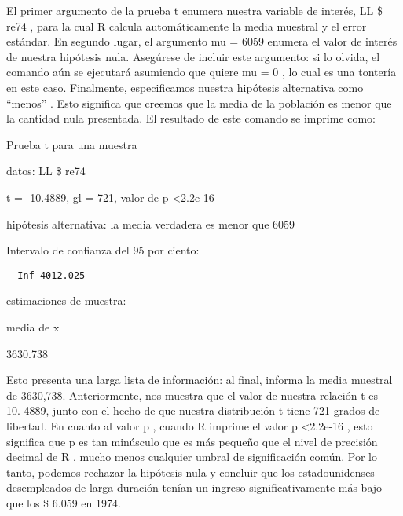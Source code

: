 \documentclass[
]{book}
\begin{document}
El primer argumento de la prueba t enumera nuestra variable de interés, LL \$ re74 , para la cual R calcula automáticamente la media muestral y el error estándar. En segundo lugar, el argumento mu = 6059 enumera el valor de interés de nuestra hipótesis nula. Asegúrese de incluir este argumento: si lo olvida, el comando aún se ejecutará asumiendo que quiere mu = 0 , lo cual es una tontería en este caso. Finalmente, especificamos nuestra hipótesis alternativa como ``menos'' . Esto significa que creemos que la media de la población es menor que la cantidad nula presentada. El resultado de este comando se imprime como:

Prueba t para una muestra

datos: LL \$ re74

t = -10.4889, gl = 721, valor de p \textless2.2e-16

hipótesis alternativa: la media verdadera es menor que 6059

Intervalo de confianza del 95 por ciento:

\begin{verbatim}
 -Inf 4012.025
\end{verbatim}

estimaciones de muestra:

media de x

3630.738

Esto presenta una larga lista de información: al final, informa la media muestral de 3630,738. Anteriormente, nos muestra que el valor de nuestra relación t es - 10. 4889, junto con el hecho de que nuestra distribución t tiene 721 grados de libertad. En cuanto al valor p , cuando R imprime el valor p \textless2.2e-16 , esto significa que p es tan minúsculo que es más pequeño que el nivel de precisión decimal de R , mucho menos cualquier umbral de significación común. Por lo tanto, podemos rechazar la hipótesis nula y concluir que los estadounidenses desempleados de larga duración tenían un ingreso significativamente más bajo que los \$ 6.059 en 1974.
\end{document}
